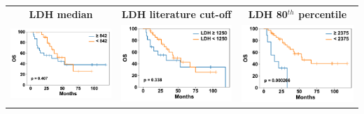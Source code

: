 \begin{tabular}{ccc}
\\[2ex]
\textbf{LDH median}
&
\textbf{LDH literature cut-off}
&
\textbf{LDH 80$^{th}$ percentile}
\\[1ex]
\includegraphics[width=\coll]{LDH_percentiles/50}
&
\includegraphics[width=\coll]{LDH}
&
\includegraphics[width=\coll]{LDH_percentiles/80}

\end{tabular}

